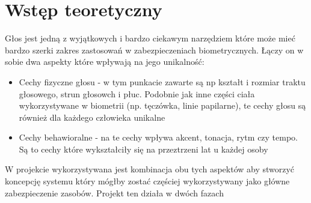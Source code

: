 \section{Wstęp teoretyczny}

Głos jest jedną z wyjątkowych i bardzo ciekawym narzędziem które może mieć bardzo szerki zakres zastosowań w zabezpieczeniach biometrycznych. Łączy on w sobie dwa aspekty które wpływają na jego unikalność:

\begin{itemize}
	\item Cechy fizyczne głosu - w tym punkacie zawarte są np kształt i rozmiar traktu głosowego, strun głosowch i płuc. Podobnie jak inne części ciała wykorzystywane w biometrii (np. tęczówka, linie papilarne), te cechy głosu są również dla każdego człowieka unikalne
	\item Cechy behawioralne - na te cechy wpływa akcent, tonacja, rytm czy tempo. Są to cechy które wykształciły się na przeztrzeni lat u każdej osoby
\end{itemize}
W projekcie wykorzystywana jest kombinacja obu tych aspektów aby stworzyć koncepcję systemu który mógłby zostać częściej wykorzystywany jako główne zabezpieczenie zasobów.
\newline
Projekt ten działa w dwóch fazach


